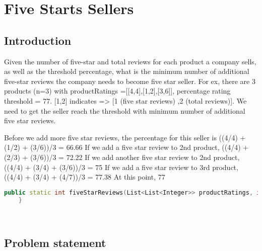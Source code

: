 %

\chapter{Five Starts Sellers}
\label{ch:five_starts_seller}
\section*{Introduction}
Given the number of five-star and total reviews for each product a company sells,
as well as the threshold percentage, 
what is the minimum number of additional five-star reviews the company needs to become five star seller.
For ex, there are 3 products (n=3) with productRatings =[[4,4],[1,2],[3,6]], percentage rating threshold = 77.
[1,2] indicates => [1 (five star reviews) ,2 (total reviews)].
We need to get the seller reach the threshold with minimum number of additional five star reviews.

Before we add more five star reviews, the percentage for this seller is ((4/4) + (1/2) + (3/6))/3 = 66.66%
If we add a five star review to 2nd product, ((4/4) + (2/3) + (3/6))/3 = 72.22%
If we add another five star review to 2nd product, ((4/4) + (3/4) + (3/6))/3 = 75%
If we add a five star review to 3rd product, ((4/4) + (3/4) + (4/7))/3 = 77.38%
At this point, 77%

\begin{lstlisting}[language=c++, caption={Definition of a linked list with a random pointer.},label=list:delete_duplicates_list:linked_list]
	public static int fiveStarReviews(List<List<Integer>> productRatings, int ratingsThreshold){
	}




\end{lstlisting}
\section{Problem statement}
\begin{exercise}

\end{exercise}


\begin{example}
	\hfill \
	
\end{example}

